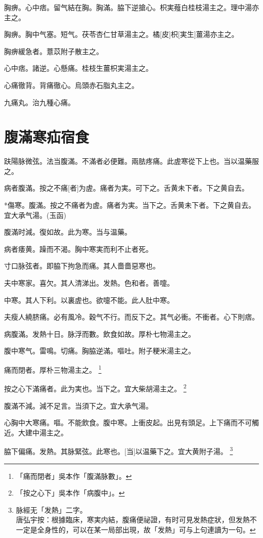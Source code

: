 \documentclass[12pt,twoside,UTF8,b5paper]{ctexbook}
\begin{document}
胸痹。心中痞。留气結在胸。胸滿。脇下逆搶心。枳実薤白桂枝湯主之。理中湯亦主之。

胸痹。胸中气塞。短气。茯苓杏仁甘草湯主之。橘[皮]枳[実生]薑湯亦主之。

胸痹緩急者。薏苡附子散主之。

心中痞。諸逆。心懸痛。桂枝生薑枳実湯主之。

心痛徹背。背痛徹心。烏頭赤石脂丸主之。

九痛丸。治九種心痛。

\chapter{腹滿寒疝宿食}

趺陽脉微弦。法当腹滿。不滿者必便難。兩胠疼痛。此虗寒從下上也。当以温藥服之。

病者腹滿。按之不痛[者]为虗。痛者为実。可下之。舌黄未下者。下之黄自去。

*傷寒。腹滿。按之不痛者为虗。痛者为実。当下之。舌黄未下者。下之黄自去。宜大承气湯。(玉函)

腹滿时減。復如故。此为寒。当与温藥。

病者痿黄。躁而不渴。胸中寒実而利不止者死。

寸口脉弦者。即脇下拘急而痛。其人嗇嗇惡寒也。

夫中寒家。喜欠。其人清涕出。发熱。色和者。善嚏。

中寒。其人下利。以裏虗也。欲嚏不能。此人肚中寒。

夫瘦人繞脐痛。必有風冷。穀气不行。而反下之。其气必衝。不衝者。心下則痞。

病腹滿。发熱十日。脉浮而數。飲食如故。厚朴七物湯主之。

腹中寒气。雷鳴。切痛。胸脇逆滿。嘔吐。附子粳米湯主之。

痛而閉者。厚朴三物湯主之。
	\footnote{「痛而閉者」吳本作「腹滿脉數」。}

按之心下滿痛者。此为実也。当下之。宜大柴胡湯主之。
	\footnote{「按之心下」吳本作「病腹中」。}

腹滿不減。減不足言。当須下之。宜大承气湯。

心胸中大寒痛。嘔。不能飲食。腹中寒。上衝皮起。出見有頭足。上下痛而不可觸近。大建中湯主之。

脇下偏痛。发熱。其脉緊弦。此寒也。[当]以温藥下之。宜大黄附子湯。
	\footnote{脉經无「发熱」二字。\\唐弘宇按：根據臨床，寒実内結，腹痛便祕證，有时可見发熱症狀，但发熱不一定是全身性的，可以在某一局部出現，故「发熱」可与上句連讀为一句。}
\end{document}
